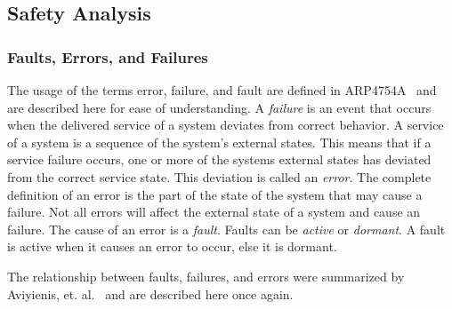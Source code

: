 \subsection{Safety Analysis}
\label{sec:safetyanalysis}





\subsubsection{Faults, Errors, and Failures}
\label{sec:terminology}
The usage of the terms error, failure, and fault are defined in ARP4754A~\cite{SAE:ARP4754A} and are described here for ease of understanding. A \textit{failure} is an event that occurs when the delivered service of a system deviates from correct behavior. A service of a system is a sequence of the system's external states. This means that if a service failure occurs, one or more of the systems external states has deviated from the correct service state. This deviation is called an \textit{error}. The complete definition of an error is the part of the state of the system that may cause a failure. Not all errors will affect the external state of a system and cause an failure. The cause of an error is a \textit{fault}. Faults can be \textit{active} or \textit{dormant}. A fault is active when it causes an error to occur, else it is dormant.

The relationship between faults, failures, and errors were summarized by Aviyienis, et. al.~\cite{basicConcepts} and are described here once again.%

